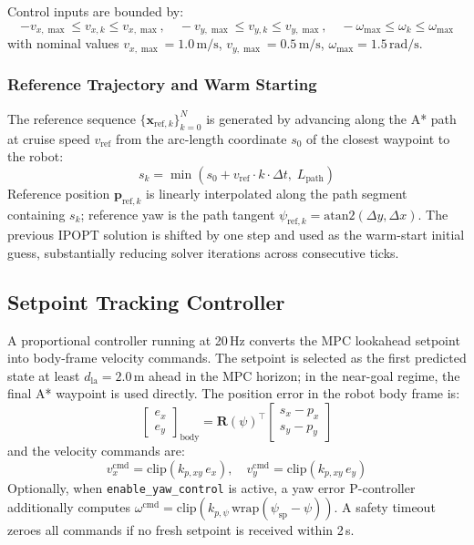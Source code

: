 \documentclass[conference]{IEEEtran}
\begin{document}
Control inputs are bounded by:
\begin{equation}
	-v_{x,\max} \le v_{x,k} \le v_{x,\max}, \quad
	-v_{y,\max} \le v_{y,k} \le v_{y,\max}, \quad
	-\omega_{\max} \le \omega_k \le \omega_{\max}
	\label{eq:bounds}
\end{equation}
with nominal values $v_{x,\max} = 1.0\,\text{m/s}$, $v_{y,\max} = 0.5\,\text{m/s}$, $\omega_{\max} = 1.5\,\text{rad/s}$.

\subsubsection{Reference Trajectory and Warm Starting}

The reference sequence $\{\mathbf{x}_{\text{ref},k}\}_{k=0}^N$ is generated by advancing along the A* path at cruise speed $v_{\text{ref}}$ from the arc-length coordinate $s_0$ of the closest waypoint to the robot:
\begin{equation}
	s_k = \min\!\left(s_0 + v_{\text{ref}} \cdot k \cdot \Delta t,\; L_{\text{path}}\right)
	\label{eq:ref-traj}
\end{equation}
Reference position $\mathbf{p}_{\text{ref},k}$ is linearly interpolated along the path segment containing $s_k$; reference yaw is the path tangent $\psi_{\text{ref},k} = \text{atan2}(\Delta y, \Delta x)$. The previous IPOPT solution is shifted by one step and used as the warm-start initial guess, substantially reducing solver iterations across consecutive ticks.

\subsection{Setpoint Tracking Controller}

A proportional controller running at 20\,Hz converts the MPC lookahead setpoint into body-frame velocity commands. The setpoint is selected as the first predicted state at least $d_{\text{la}} = 2.0\,\text{m}$ ahead in the MPC horizon; in the near-goal regime, the final A* waypoint is used directly. The position error in the robot body frame is:
\begin{equation}
	\begin{bmatrix} e_x \\ e_y \end{bmatrix}_{\text{body}} = \mathbf{R}(\psi)^\top \begin{bmatrix} s_x - p_x \\ s_y - p_y \end{bmatrix}
	\label{eq:body-err}
\end{equation}
and the velocity commands are:
\begin{equation}
	v_x^{\text{cmd}} = \text{clip}(k_{p,xy}\,e_x), \quad v_y^{\text{cmd}} = \text{clip}(k_{p,xy}\,e_y)
	\label{eq:cmd-vel}
\end{equation}
Optionally, when \texttt{enable\_yaw\_control} is active, a yaw error P-controller additionally computes $\omega^{\text{cmd}} = \text{clip}(k_{p,\psi}\,\text{wrap}(\psi_{\text{sp}} - \psi))$. A safety timeout zeroes all commands if no fresh setpoint is received within 2\,s.
\end{document}
